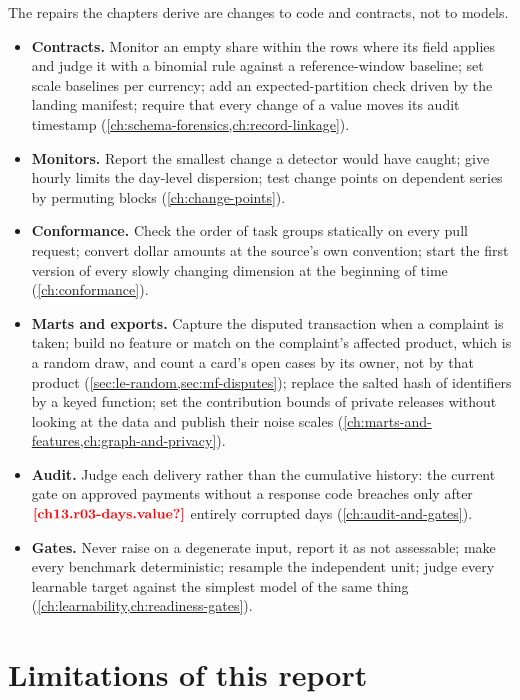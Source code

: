 The repairs the chapters derive are changes to code and contracts, not to models.
\begin{itemize}
  \item \textbf{Contracts.} Monitor an empty share within the rows where its field applies and judge it with a binomial
  rule against a reference-window baseline; set scale baselines per currency; add an expected-partition check driven
  by the landing manifest; require that every change of a value moves its audit timestamp
  (\cref{ch:schema-forensics,ch:record-linkage}).
  \item \textbf{Monitors.} Report the smallest change a detector would have caught; give hourly limits the day-level
  dispersion; test change points on dependent series by permuting blocks (\cref{ch:change-points}).
  \item \textbf{Conformance.} Check the order of task groups statically on every pull request; convert dollar amounts at
  the source's own convention; start the first version of every slowly changing dimension at the beginning of time
  (\cref{ch:conformance}).
  \item \textbf{Marts and exports.} Capture the disputed transaction when a complaint is taken; build no feature or
  match on the complaint's affected product, which is a random draw, and count a card's open cases by its owner, not by
  that product (\cref{sec:le-random,sec:mf-disputes}); replace
  the salted hash of identifiers by a keyed function; set the contribution bounds of private releases without looking
  at the data and publish their noise scales (\cref{ch:marts-and-features,ch:graph-and-privacy}).
  \item \textbf{Audit.} Judge each delivery rather than the cumulative history: the current gate on approved payments
  without a response code breaches only after $\est{ch13.r03-days}{value}$ entirely corrupted days
  (\cref{ch:audit-and-gates}).
  \item \textbf{Gates.} Never raise on a degenerate input, report it as not assessable; make every benchmark
  deterministic; resample the independent unit; judge every learnable target against the simplest model of the same
  thing (\cref{ch:learnability,ch:readiness-gates}).
\end{itemize}

\section{Limitations of this report}\label{sec:cc-limits}

